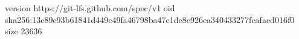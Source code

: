 version https://git-lfs.github.com/spec/v1
oid sha256:13c89e93b61841d449c49fa46798ba47c1de8c926ca340433277fcafaed016f0
size 23636
